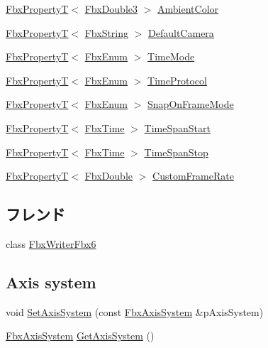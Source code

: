 \begin{DoxyCompactItemize}
\item 
\hyperlink{class_fbx_property_t}{Fbx\+PropertyT}$<$ \hyperlink{fbxtypes_8h_ae0a96f14cde566774c7553aa7523b7a7}{Fbx\+Double3} $>$ \hyperlink{class_fbx_global_settings_ae88d400ce323626f0293c03531c79975}{Ambient\+Color}
\item 
\hyperlink{class_fbx_property_t}{Fbx\+PropertyT}$<$ \hyperlink{class_fbx_string}{Fbx\+String} $>$ \hyperlink{class_fbx_global_settings_ae22135d96da50b31043a31bdf8815daf}{Default\+Camera}
\item 
\hyperlink{class_fbx_property_t}{Fbx\+PropertyT}$<$ \hyperlink{fbxtypes_8h_a9a28614cb4272a0ad7d748eda7f3d3e5}{Fbx\+Enum} $>$ \hyperlink{class_fbx_global_settings_a0bb2b74ae4ea617f08d00b368f5d7c8d}{Time\+Mode}
\item 
\hyperlink{class_fbx_property_t}{Fbx\+PropertyT}$<$ \hyperlink{fbxtypes_8h_a9a28614cb4272a0ad7d748eda7f3d3e5}{Fbx\+Enum} $>$ \hyperlink{class_fbx_global_settings_aa210c0c36889f764b53066082ca5452a}{Time\+Protocol}
\item 
\hyperlink{class_fbx_property_t}{Fbx\+PropertyT}$<$ \hyperlink{fbxtypes_8h_a9a28614cb4272a0ad7d748eda7f3d3e5}{Fbx\+Enum} $>$ \hyperlink{class_fbx_global_settings_aa698429b48e7e2c404a7a0ca8bdee18e}{Snap\+On\+Frame\+Mode}
\item 
\hyperlink{class_fbx_property_t}{Fbx\+PropertyT}$<$ \hyperlink{class_fbx_time}{Fbx\+Time} $>$ \hyperlink{class_fbx_global_settings_a58fe5bbda2ad6c833cec07c3ca158aba}{Time\+Span\+Start}
\item 
\hyperlink{class_fbx_property_t}{Fbx\+PropertyT}$<$ \hyperlink{class_fbx_time}{Fbx\+Time} $>$ \hyperlink{class_fbx_global_settings_a4f60466f7d9a757dcf3bf50d22701846}{Time\+Span\+Stop}
\item 
\hyperlink{class_fbx_property_t}{Fbx\+PropertyT}$<$ \hyperlink{fbxtypes_8h_a171e72a1c46fc15c1a6c9c31948c1c5b}{Fbx\+Double} $>$ \hyperlink{class_fbx_global_settings_a4d9660899e5c2a3bd45c962f062ffbe5}{Custom\+Frame\+Rate}
\end{DoxyCompactItemize}
\subsection*{フレンド}
\begin{DoxyCompactItemize}
\item 
class \hyperlink{class_fbx_global_settings_aac0b71d5f5893e5b1c45f6eba4e78b24}{Fbx\+Writer\+Fbx6}
\end{DoxyCompactItemize}
\subsection*{Axis system}
\begin{DoxyCompactItemize}
\item 
void \hyperlink{class_fbx_global_settings_a91f1d5394d02d07f3a5cd9ee3df057e2}{Set\+Axis\+System} (const \hyperlink{class_fbx_axis_system}{Fbx\+Axis\+System} \&p\+Axis\+System)
\item 
\hyperlink{class_fbx_axis_system}{Fbx\+Axis\+System} \hyperlink{class_fbx_global_settings_adf26f4742b088b497a5ecec8f458e47d}{Get\+Axis\+System} ()
\end{DoxyCompactItemize}
